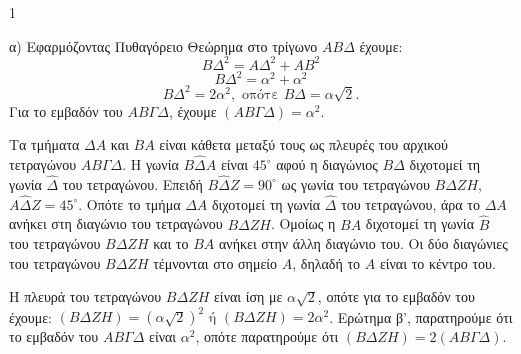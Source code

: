\begin{ylh}{1}
    \item [Ύλη από εικόνα]
\end{ylh}
α) Εφαρμόζοντας Πυθαγόρειο Θεώρημα στο τρίγωνο $AB\Delta$ έχουμε:
\[ B\Delta^2 = A\Delta^2 + AB^2 \]
\[ B\Delta^2 = \alpha^2 + \alpha^2 \]
\[ B\Delta^2 = 2\alpha^2, \text{ οπότε } B\Delta = \alpha\sqrt{2}. \]
Για το εμβαδόν του $AB\Gamma\Delta$, έχουμε $(AB\Gamma\Delta) = \alpha^2$.

\begin{alist}
\item \begin{rlist}
\item
\begin{figure}
\centering
{}
\end{figure}
Τα τμήματα $\Delta A$ και $BA$ είναι κάθετα μεταξύ τους ως πλευρές του αρχικού τετραγώνου $AB\Gamma\Delta$. Η γωνία $B\hat{\Delta}A$ είναι $45^\circ$ αφού η διαγώνιος $B\Delta$ διχοτομεί τη γωνία $\hat{\Delta}$ του τετραγώνου. Επειδή $B\hat{\Delta}Z = 90^\circ$ ως γωνία του τετραγώνου $B\Delta ZH$, $A\hat{\Delta}Z = 45^\circ$. Οπότε το τμήμα $\Delta A$ διχοτομεί τη γωνία $\hat{\Delta}$ του τετραγώνου, άρα το $\Delta A$ ανήκει στη διαγώνιο του τετραγώνου $B\Delta ZH$. Ομοίως η $BA$ διχοτομεί τη γωνία $\hat{B}$ του τετραγώνου $B\Delta ZH$ και το $BA$ ανήκει στην άλλη διαγώνιο του. Οι δύο διαγώνιες του τετραγώνου $B\Delta ZH$ τέμνονται στο σημείο $A$, δηλαδή το $A$ είναι το κέντρο του.
\item
Η πλευρά του τετραγώνου $B\Delta ZH$ είναι ίση με $\alpha\sqrt{2}$, οπότε για το εμβαδόν του έχουμε: $(B\Delta ZH) = (\alpha\sqrt{2})^2 \text{ ή } (B\Delta ZH) = 2\alpha^2$. Ερώτημα β', παρατηρούμε ότι το εμβαδόν του $AB\Gamma\Delta$ είναι $\alpha^2$, οπότε παρατηρούμε ότι $(B\Delta ZH) = 2(AB\Gamma\Delta)$.
\end{rlist}


\end{alist}
